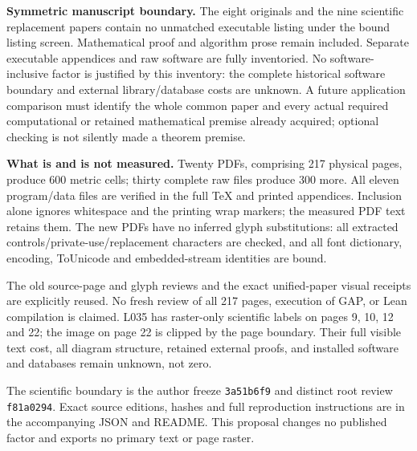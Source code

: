\documentclass[11pt,a4paper]{article}
\begin{document}
\textbf{Symmetric manuscript boundary.}
The eight originals and the nine scientific replacement papers contain no unmatched
executable listing under the bound listing screen. Mathematical proof and algorithm
prose remain included. Separate executable appendices and raw software are fully
inventoried. No software-inclusive factor is justified by this inventory: the complete
historical software boundary and external library/database costs are unknown.
A future application comparison must identify the whole common paper and every
actual required computational or retained mathematical premise already acquired;
optional checking is not silently made a theorem premise.

\textbf{What is and is not measured.}
Twenty PDFs, comprising 217 physical pages, produce 600 metric cells; thirty complete
raw files produce 300 more. All eleven program/data files are verified in the full
TeX and printed appendices. Inclusion alone ignores whitespace and the printing
wrap markers; the measured PDF text retains them. The new PDFs have no inferred
glyph substitutions: all extracted controls/private-use/replacement characters are
checked, and all font dictionary, encoding, ToUnicode and embedded-stream identities
are bound.

The old source-page and glyph reviews and the exact unified-paper visual receipts
are explicitly reused. No fresh review of all 217 pages, execution of GAP, or Lean
compilation is claimed. L035 has raster-only scientific labels on pages 9, 10, 12
and 22; the image on page 22 is clipped by the page boundary. Their full visible
text cost, all diagram structure, retained external proofs, and installed software
and databases remain unknown, not zero.

The scientific boundary is the author freeze \texttt{3a51b6f9} and distinct root
review \texttt{f81a0294}. Exact source editions, hashes and full reproduction
instructions are in the accompanying JSON and README. This proposal changes no
published factor and exports no primary text or page raster.
\end{document}
